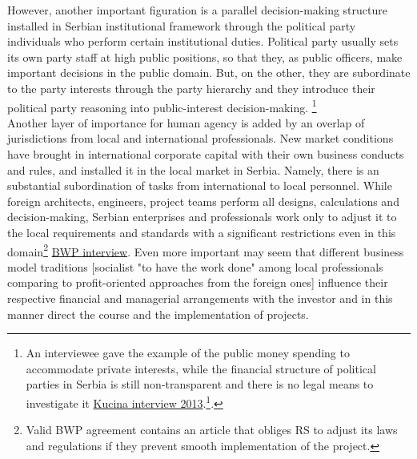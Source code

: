 \documentclass[11pt]{report}
\begin{document}
However, another important figuration is a parallel decision-making structure  installed in Serbian institutional framework through the political party individuals who perform certain institutional duties.
Political party usually sets its own party staff at high public positions, so that they, as public officers, make important decisions in the public domain.
But, on the other, they are subordinate to the party interests through the party hierarchy and they introduce their political party reasoning into public-interest decision-making. \footnote
{An interviewee gave the example of the public money spending to accommodate private interests,
while the financial structure of political parties in Serbia is still non-transparent and there is no legal means to investigate it \href{}{Kucina interview 2013}.\footnote{
Another gave the example how a professional in high education had slowly changed his approach to the job during his term as a high officer of the political party in power \href{}{Association of architects interview}.}.}
\\
Another layer of importance for human agency is added by an overlap of jurisdictions from local and international professionals.
New market conditions have brought in international corporate capital with their own business conducts and rules, and installed it in the local market in Serbia. Namely, there is an substantial subordination of tasks from international to local personnel.
While foreign architects, engineers, project teams perform all designs, calculations and decision-making, Serbian enterprises and professionals work only to adjust it to the local requirements and standards with a significant restrictions even in this domain\footnote{Valid BWP agreement contains an article that obliges RS to adjust its laws and regulations if they prevent smooth implementation of the project.}  \href{}{BWP interview}.
Even more important may seem that different business model traditions [socialist "to have the work done" among local professionals comparing to profit-oriented approaches from the foreign ones]
influence their respective financial and managerial arrangements with the investor and in this manner direct the course and the implementation of projects.
\end{document}
